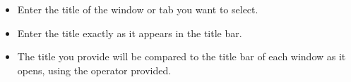
\begin{itemize}
\item Enter the title of the window or tab you want to select. 
\item Enter the title exactly as it appears in the title bar.
\item The title you provide will be compared to the title bar of each window as it opens, using the operator provided.
\end{itemize}
